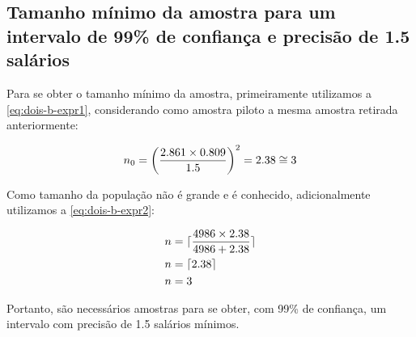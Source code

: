 \subsection{Tamanho mínimo da amostra para um intervalo de 99\% de confiança e precisão de 1.5 salários}
Para se obter o tamanho mínimo da amostra, primeiramente utilizamos a \autoref{eq:dois-b-expr1}, considerando 
como amostra piloto a mesma amostra retirada anteriormente:

\begin{align*}
	n_0 = \left (\frac{2.861 \times 0.809}{1.5} \right)^2 = 2.38 \cong 3
\end{align*}

Como tamanho da população não é grande e é conhecido, adicionalmente utilizamos a \autoref{eq:dois-b-expr2}:

\begin{align*}
		n &= \lceil \frac{4986 \times 2.38}{4986 + 2.38} \rceil \\
		n &= \lceil 2.38 \rceil \\
		n &= 3
\end{align*}

Portanto, são necessários \TRESnZeroCorrigidoRounded amostras para se obter, com 99\% de confiança,
um intervalo com precisão de 1.5 salários mínimos.



